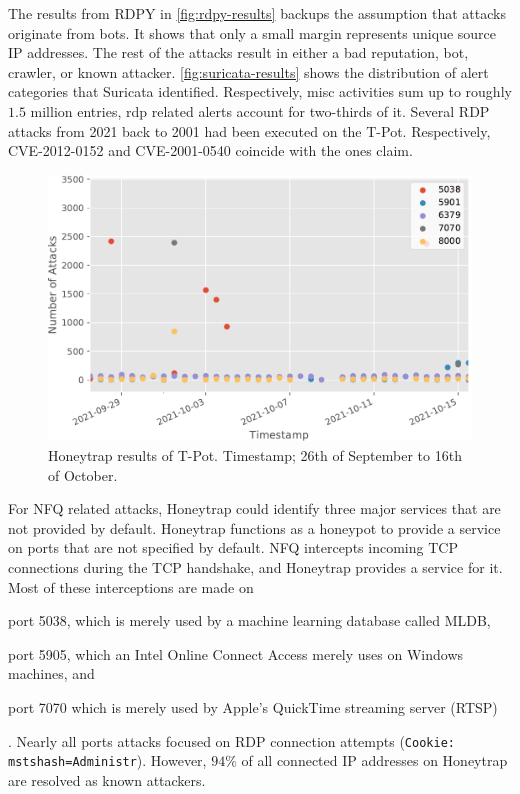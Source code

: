The results from RDPY in \autoref{fig:rdpy-results} backups the assumption that attacks originate from bots.
It shows that only a small margin represents unique source IP addresses.
The rest of the attacks result in either a bad reputation, bot, crawler, or known attacker.
\autoref{fig:suricata-results} shows the distribution of alert categories that Suricata identified.
Respectively, misc activities sum up to roughly $1.5$ million entries, \ac{rdp} related alerts account for two-thirds of it.
Several RDP attacks from 2021 back to 2001 had been executed on the T-Pot.
Respectively, CVE-2012-0152 and CVE-2001-0540 coincide with the ones \citet{Kelly2021} claim.

\begin{figure}[ht]
    \centering
    \includegraphics[width=\textwidth]{figures/tpot-honeytrap-port.pdf}
    \caption[Honeytrap results of T-Pot]{
        Honeytrap results of T-Pot.
        Timestamp; 26th of September to 16th of October.
    }
    \label{fig:honeytrap-results}
\end{figure}
For NFQ related attacks, Honeytrap could identify three major services that are not provided by default.
Honeytrap functions as a honeypot to provide a service on ports that are not specified by default.
NFQ intercepts incoming TCP connections during the TCP handshake, and Honeytrap provides a service for it.
Most of these interceptions are made on
\begin{enumerate*}[label=(\roman*)]
    \item port 5038, which is merely used by a machine learning database called MLDB,
    \item port 5905, which an Intel Online Connect Access merely uses on Windows machines, and
    \item port 7070 which is merely used by Apple's QuickTime streaming server (RTSP)
\end{enumerate*}.
Nearly all ports attacks focused on RDP connection attempts (\verb|Cookie: mstshash=Administr|).
However, $94\%$ of all connected IP addresses on Honeytrap are resolved as known attackers.


